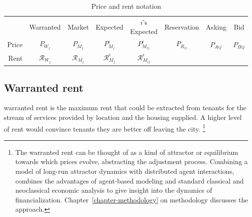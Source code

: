 

\begin{table}[!ht]
\centering
{\renewcommand{\arraystretch}{1.6}
\begin{tabular}{r|c|c|c|c|c|c|c|}\cline{2-8}
       & Warranted  & Market & Expected & $i$'s Expected & Reservation & Asking & Bid     \\ \cline{2-8}
Price  & $P_{W_j}$      & $P_{M_j}$  & $P_{M_j}^\epsilon$ & $P_{M_{ij}}^{\epsilon}$     & $P_{R_{ij}}$       & $P_{A{ij}}$  & $P_{B{ij}}$   \\ \cline{2-8}
Rent  & $\mathcal{R}_{W_j}$      & $\mathcal{R}_{M_j}$  & $\mathcal{R}_{M_j}^\epsilon$ & $\mathcal{R}_{M_{ij}}^{\epsilon}$     &       &   &   \\ \cline{2-8}
\end{tabular}
 }   

\caption{Price and rent notation}
\label{table-price-notation}
\end{table}




\subsection{Warranted rent}\label{sec:warranted-rent}
\Gls{warranted rent} is the maximum rent that could be extracted from tenants for the stream of services provided by location and the housing supplied. A higher level of rent would convince tenants they are better off leaving the city.
\footnote{The warranted rent can be thought of as a kind of \gls{attractor} or \gls{equilibrium} towards which prices evolve, abstracting %
the adjustment process. %
Combining a model of long-run attractor dynamics with distributed agent interactions, combines the advantages of agent-based modeling and standard \gls{classical} and \gls{neoclassical} economic analysis to give insight into the dynamics of financialization. Chapter~\ref{chapter-methodology} on methodology discusses the approach.} 

